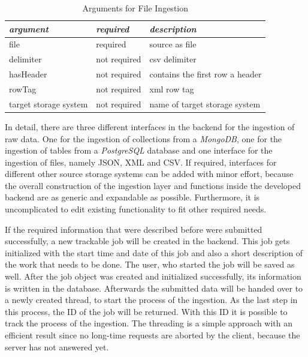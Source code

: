 \documentclass[conference]{IEEEtran}
\begin{document}
\begin{table}[htbp]
\begin{center}
\begin{tabular}{|l|l|l|}
\cline{1-3} 
\textbf{\textit{argument}}& \textbf{\textit{required}}& \textbf{\textit{description}} \\
\hline
file & required & source as file  \\
\hline
delimiter & not required & csv delimiter\\
\hline
hasHeader & not required & contains the first row a header\\
\hline
rowTag & not required & xml row tag\\
\hline
target storage system & not required & name of target storage system  \\
\hline
\end{tabular}
\label{TAB_FI}
\end{center}
\caption{Arguments for File Ingestion}
\end{table}

In detail, there are three different interfaces in the backend for the ingestion of raw data. 
One for the ingestion of collections from a \textit{MongoDB}, one for the ingestion of tables from a 
\textit{PostgreSQL} database and one interface for the ingestion of files, namely JSON, XML and CSV. 
If required, interfaces for different other source storage systems can be added with minor effort, 
because the overall construction of the ingestion layer and functions inside the developed backend 
are as generic and expandable as possible. 
Furthermore, it is uncomplicated to edit existing functionality to fit other required needs.

If the required information that were described before were submitted successfully, a new trackable 
job will be created in the backend. 
This job gets initialized with the start time and date of this job and also a short description of 
the work that needs to be done.
The user, who started the job will be saved as well.
After the job object was created and initialized successfully, its information is written in the 
database.
Afterwards the submitted data will be handed over to a newly created thread, to start the process of 
the ingestion. 
As the last step in this process, the ID of the job will be returned.
With this ID it is possible to track the process of the ingestion. 
The threading is a simple approach with an efficient result since no long-time requests are 
aborted by the client, because the server has not answered yet.
\end{document}

